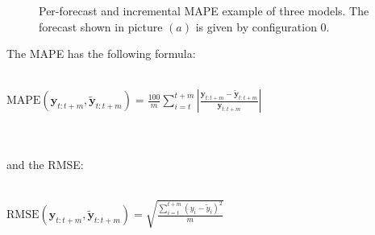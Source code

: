 \documentclass[a4paper, 12pt]{article} %
\begin{document}
	\begin{figure}\centering
		 \hfill
		 \hfill
		
		\caption{Per-forecast and incremental MAPE example of three models. The forecast shown in picture $(a)$ is given by configuration $0$.}
		\label{fig:exp_setup_forecasting}
	\end{figure}
	
	The MAPE has the following formula:\\\\
	\centerline{
	$
	\text{MAPE}(\pmb{y}_{t:t+m}, \tilde{\pmb{y}}_{t:t+m}) = \frac{100}{m} \sum_{i=t}^{t+m} |\frac{\pmb{y}_{t:t+m}-\tilde{\pmb{y}}_{t:t+m}}{\pmb{y}_{t:t+m}}|
	$
	}\\\\
	and the RMSE:\\\\
	\centerline{
		$
		\text{RMSE}(\pmb{y}_{t:t+m}, \tilde{\pmb{y}}_{t:t+m}) = \sqrt{\frac{\sum_{i=t}^{t+m} (y_i - \tilde{y}_i)^2 }{m}}
		$
	}\\\\
	
\end{document}
